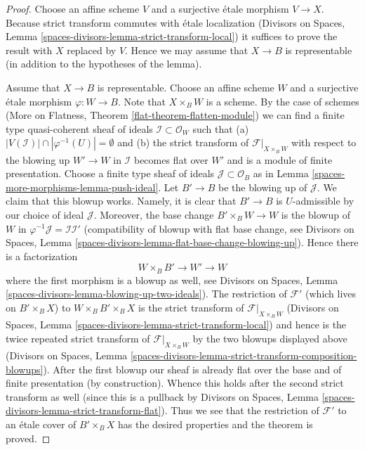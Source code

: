 \begin{proof}
Choose an affine scheme $V$ and a surjective \'etale morphism $V \to X$.
Because strict transform commutes with \'etale localization
(Divisors on Spaces, Lemma \ref{spaces-divisors-lemma-strict-transform-local})
it suffices to prove the result with $X$ replaced by $V$. Hence we
may assume that $X \to B$ is representable (in addition to the
hypotheses of the lemma).

\medskip\noindent
Assume that $X \to B$ is representable. Choose an affine scheme $W$ and a
surjective \'etale morphism $\varphi : W \to B$. Note that $X \times_B W$
is a scheme. By the case of schemes
(More on Flatness, Theorem \ref{flat-theorem-flatten-module})
we can find a finite type quasi-coherent sheaf of ideals
$\mathcal{I} \subset \mathcal{O}_W$ such that
(a) $|V(\mathcal{I})| \cap |\varphi^{-1}(U)| = \emptyset$ and (b)
the strict transform of $\mathcal{F}|_{X \times_B W}$ with respect
to the blowing up $W' \to W$ in $\mathcal{I}$ becomes flat over $W'$
and is a module of finite presentation. Choose a finite type sheaf of ideals
$\mathcal{J} \subset \mathcal{O}_B$ as in Lemma \ref{spaces-more-morphisms-lemma-push-ideal}.
Let $B' \to B$ be the blowing up of $\mathcal{J}$. We claim that this
blowup works. Namely, it is clear that $B' \to B$ is $U$-admissible
by our choice of ideal $\mathcal{J}$. Moreover, the base change
$B' \times_B W \to W$ is the blowup of $W$ in
$\varphi^{-1}\mathcal{J} = \mathcal{I}\mathcal{I}'$
(compatibility of blowup with flat base change, see
Divisors on Spaces, Lemma
\ref{spaces-divisors-lemma-flat-base-change-blowing-up}).
Hence there is a factorization
$$
W \times_B B' \to W' \to W
$$
where the first morphism is a blowup as well, see
Divisors on Spaces, Lemma \ref{spaces-divisors-lemma-blowing-up-two-ideals}).
The restriction of $\mathcal{F}'$ (which lives on $B' \times_B X$)
to $W \times_B B' \times_B X$ is the strict transform of
$\mathcal{F}|_{X \times_B W}$
(Divisors on Spaces, Lemma \ref{spaces-divisors-lemma-strict-transform-local})
and hence is the twice repeated strict transform of
$\mathcal{F}|_{X \times_B W}$ by the two blowups displayed above
(Divisors on Spaces, Lemma
\ref{spaces-divisors-lemma-strict-transform-composition-blowups}).
After the first blowup our sheaf is already flat over
the base and of finite presentation (by construction). Whence this holds
after the second strict transform as well (since this is a
pullback by Divisors on Spaces, Lemma
\ref{spaces-divisors-lemma-strict-transform-flat}).
Thus we see that the restriction of $\mathcal{F}'$
to an \'etale cover of $B' \times_B X$ has the desired properties
and the theorem is proved.
\end{proof}

